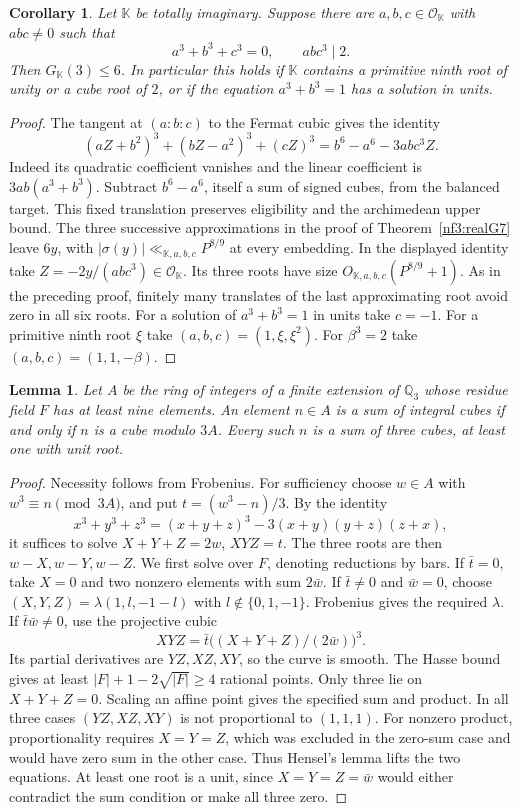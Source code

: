 \documentclass[11pt,letterpaper]{article}
\newtheorem{lemma}[lemma]{Lemma}
\newtheorem{corollary}[corollary]{Corollary}
\theoremstyle{definition}
\numberwithin{equation}{section}
\begin{document}
\begin{corollary}\label{nf3:imag6}\label{nf3:fermat-tangent}
Let $\mathbb K$ be totally imaginary. Suppose there are $a,b,c\in
\mathcal O_{\mathbb K}$ with $abc\ne0$ such that
\[
             a^3+b^3+c^3=0,\qquad abc^3\mid 2.
\]
Then $G_{\mathbb K}(3)\le6$. In particular this holds if
$\mathbb K$ contains a primitive ninth root of unity or a cube root
of $2$, or if the equation $a^3+b^3=1$ has a solution in units.
\end{corollary}
\begin{proof}
The tangent at $(a:b:c)$ to the Fermat cubic gives the identity
\[
  (aZ+b^2)^3+(bZ-a^2)^3+(cZ)^3
      =b^6-a^6-3abc^3 Z.
\]
Indeed its quadratic coefficient vanishes and the linear coefficient
is $3ab(a^3+b^3)$. Subtract $b^6-a^6$, itself a sum of signed cubes,
from the balanced target. This fixed translation preserves eligibility
and the archimedean upper bound. The three successive approximations
in the proof of Theorem~\ref{nf3:realG7} leave $6y$, with
$|\sigma(y)|\ll_{\mathbb K,a,b,c}P^{8/9}$ at every embedding.
In the displayed identity take $Z=-2y/(abc^3)\in\mathcal O_{\mathbb K}$.
Its three roots have size $O_{\mathbb K,a,b,c}(P^{8/9}+1)$.
As in the preceding proof, finitely many translates of the last
approximating root avoid zero in all six roots. For a solution of
$a^3+b^3=1$ in units take $c=-1$.
For a primitive ninth root $\xi$ take $(a,b,c)=(1,\xi,\xi^2)$.
For $\beta^3=2$ take $(a,b,c)=(1,1,-\beta)$.
\end{proof}

\begin{lemma}\label{nf3:triadic-three}
Let $A$ be the ring of integers of a finite extension of $\mathbb Q_3$
whose residue field $F$ has at least nine elements. An element $n\in A$
is a sum of integral cubes if and only if $n$ is a cube modulo $3A$.
Every such $n$ is a sum of three cubes, at least one with unit root.
\end{lemma}
\begin{proof}
Necessity follows from Frobenius. For sufficiency choose $w\in A$
with $w^3\equiv n\pmod{3A}$, and put $t=(w^3-n)/3$.
By the identity
\[
 x^3+y^3+z^3=(x+y+z)^3-3(x+y)(y+z)(z+x),
\]
it suffices to solve $X+Y+Z=2w$, $XYZ=t$. The three roots are then
$w-X,w-Y,w-Z$. We first solve over $F$, denoting reductions by bars.
If $\bar t=0$, take $X=0$ and two nonzero elements with sum $2\bar w$.
If $\bar t\ne0$ and $\bar w=0$, choose
$(X,Y,Z)=\lambda(1,l,-1-l)$ with $l\notin\{0,1,-1\}$.
Frobenius gives the required $\lambda$.
If $\bar t\bar w\ne0$, use the projective cubic
\[
 XYZ=\bar t\big((X+Y+Z)/(2\bar w)\big)^3.
\]
Its partial derivatives are $YZ,XZ,XY$, so the curve is smooth.
The Hasse bound \cite{NFWeilCurves} gives at least
$|F|+1-2\sqrt{|F|}\ge4$ rational points. Only three lie on
$X+Y+Z=0$. Scaling an affine point gives the specified sum and
product. In all three cases $(YZ,XZ,XY)$ is not proportional to
$(1,1,1)$. For nonzero product, proportionality requires $X=Y=Z$,
which was excluded in the zero-sum case and would have zero sum in
the other case. Thus Hensel's lemma lifts the two equations. At
least one root is a unit, since $X=Y=Z=\bar w$ would either
contradict the sum condition or make all three zero.
\end{proof}
\end{document}
